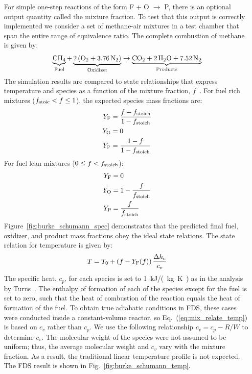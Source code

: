 \documentclass[11pt]{book}
\begin{document}
For simple one-step reactions of the form F + O $\rightarrow$ P, there is an optional output quantity called the mixture fraction. To test that this output is correctly implemented we consider a set of methane-air mixtures in a test chamber that span the entire range of equivalence ratio. The complete combustion of methane is given by:
\begin{equation}\label{eq:methane_ex2}
\underbrace{\mathrm{CH_4}}_{\rm Fuel} + \underbrace{\mathrm{2\,(O_2 + 3.76\,N_2)}}_{\rm Oxidizer} \rightarrow  \underbrace{\mathrm{CO_2 + 2\, H_2O + 7.52\,N_2}}_{\rm Products}
\end{equation}
The simulation results are compared to state relationships that express temperature and species as a function of the mixture fraction, $f$~\cite{Turns:1996}. For fuel rich mixtures ($f_{\rm stoic} < f \le 1$), the expected species mass fractions are:
\begin{align}\label{eq:mix_relate_rich}
Y_{\rm F} &= \frac{f-f_{\rm stoich}}{1-f_{\rm stoich}} \\
Y_{\rm O} &= 0 \\
Y_{\rm P} &= \frac{1-f}{1-f_{\rm stoich}}
\end{align}
For fuel lean mixtures ($0 \le f < f_{\rm stoich}$):
\begin{align}\label{eq:mix_relate_lean}
Y_{\rm F} &= 0 \\
Y_{\rm O} &= 1- \frac{f}{f_{\rm stoich}} \\
Y_{\rm P} &= \frac{f}{f_{\rm stoich}}
\end{align}
Figure~\ref{fig:burke_schumann_spec} demonstrates that the predicted final fuel, oxidizer, and product mass fractions obey the ideal state relations. The state relation for temperature is given by:
\begin{equation}\label{eq:mix_relate_temp}
T = T_0 +  (f-Y_{\rm F}(f)) \, \frac{\Delta h_{\rm c}}{c_{v}}
\end{equation}
The specific heat, $c_p$, for each species is set to 1~\si{kJ/(kg.K)} as in the analysis by Turns~\cite{Turns:1996}. The enthalpy of formation of each of the species except for the fuel is set to zero, such that the heat of combustion of the reaction equals the heat of formation of the fuel. To obtain true adiabatic conditions in FDS, these cases were conducted inside a constant-volume reactor, so Eq.~(\ref{eq:mix_relate_temp}) is based on $c_v$ rather than $c_p$. We use the  following relationship $c_v = c_p - R/W$ to determine $c_v$. The molecular weight of the species were not assumed to be uniform; thus, the average molecular weight and $c_v$ vary with the mixture fraction. As a result, the traditional linear temperature profile is not expected.  The FDS result is shown in Fig.~\ref{fig:burke_schumann_temp}.
\end{document}
